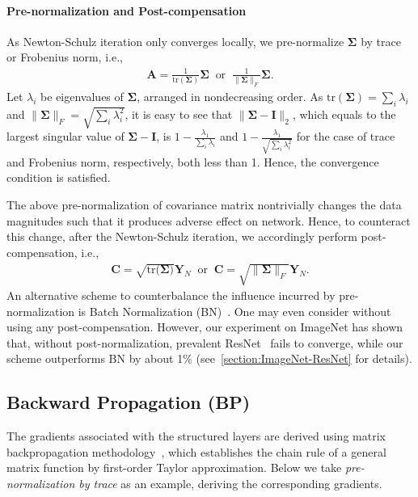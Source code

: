 \documentclass[10pt,twocolumn,letterpaper]{article}
\begin{document}
\vspace{-8pt}\paragraph{Pre-normalization and Post-compensation} As Newton-Schulz iteration only converges locally, we pre-normalize $\boldsymbol{\Sigma}$ by trace or Frobenius norm, i.e.,
\begin{align}\label{equ:pre-normalization}
\mathbf{A}=\frac{1}{\mathrm{tr}(\boldsymbol{\Sigma})}\boldsymbol{\Sigma} \;\; \text{or}\;\;
\frac{1}{\|\boldsymbol{\Sigma}\|_{F}}\boldsymbol{\Sigma}.
\end{align}
Let $\lambda_{i}$ be eigenvalues of $\boldsymbol{\Sigma}$, arranged in nondecreasing order. As $\mathrm{tr}(\boldsymbol{\Sigma})=\sum_{i}\lambda_{i}$ and $\|\boldsymbol{\Sigma}\|_{F}=\sqrt{\sum_{i}\lambda_{i}^{2}}$, it is easy to see that $\|\boldsymbol{\Sigma}-\mathbf{I}\|_{2}$, which equals to the largest singular value of $\boldsymbol{\Sigma}-\mathbf{I}$, is $1-\frac{\lambda_{1}}{\sum_{i}\lambda_{i}}$ and $1-\frac{\lambda_{1}}{\sqrt{\sum_{i}\lambda_{i}^{2}}}$ for the case of trace and Frobenius norm, respectively, both  less than 1. Hence, the convergence condition is satisfied. 

The above pre-normalization of  covariance matrix nontrivially changes the data magnitudes such that it produces adverse effect on network. Hence, to counteract this change, after the Newton-Schulz iteration,  we accordingly perform post-compensation, i.e.,
\begin{align}\label{equ:post-compensation}
\mathbf{C}=\sqrt{\mathrm{tr}(\boldsymbol{\Sigma)}}\mathbf{Y}_{N}\;\; \text{or}\;\; \mathbf{C}=\sqrt{\|\boldsymbol{\Sigma}\|_{F}}\mathbf{Y}_{N}.
\end{align}
An alternative scheme to  counterbalance the influence incurred by  pre-normalization is Batch Normalization (BN)~\cite{DBLP:journals/corr/IoffeS15}. One may even consider without using any post-compensation. However, our experiment on ImageNet  has shown that, without post-normalization, prevalent ResNet~\cite{He_2016_CVPR} fails to converge, while our scheme outperforms BN by about 1\% (see~\ref{section:ImageNet-ResNet} for details).

\subsection{Backward Propagation (BP)}\label{subsection:backward}

The gradients associated with the structured layers are derived using matrix backpropagation methodology~\cite{IonescuVS15}, which establishes the chain rule of a general matrix function by  first-order Taylor approximation.  Below we take \textit{pre-normalization by trace} as an example, deriving the corresponding gradients.
\end{document}
